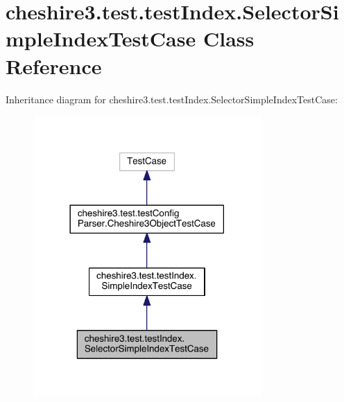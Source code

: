 \hypertarget{classcheshire3_1_1test_1_1test_index_1_1_selector_simple_index_test_case}{\section{cheshire3.\-test.\-test\-Index.\-Selector\-Simple\-Index\-Test\-Case Class Reference}
\label{classcheshire3_1_1test_1_1test_index_1_1_selector_simple_index_test_case}
}


Inheritance diagram for cheshire3.\-test.\-test\-Index.\-Selector\-Simple\-Index\-Test\-Case\-:
\nopagebreak
\begin{figure}[H]
\begin{center}
\leavevmode
\includegraphics[width=246pt]{classcheshire3_1_1test_1_1test_index_1_1_selector_simple_index_test_case__inherit__graph}
\end{center}
\end{figure}


